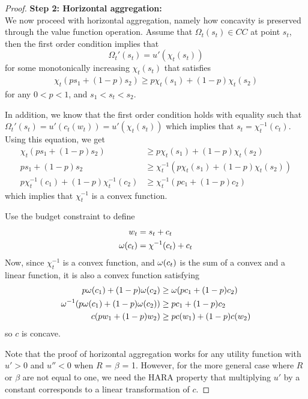 \begin{proof}
	\bigskip
	\noindent \textbf{Step 2: Horizontal aggregation:} \\
	We now proceed with horizontal aggregation, namely how concavity is preserved through the value function operation. Assume that $\Omega_t(s_t) \in CC$ at point $s_t$, then the first order condition implies that
	\[\Omega_t'(s_t) = u'(\chi_t(s_t))\]
	for some monotonically increasing $\chi_t(s_t)$ that satisfies
	\begin{align}
	\chi_t(ps_1 + (1-p)s_2) \geq p\chi_t(s_1) + (1-p)\chi_t(s_2) \label{eq:hor_conc}
	\end{align}
	for any $0 < p < 1$, and $s_1 < s_t < s_2$. %
	
	In addition, we know that the first order condition holds with equality such that $\Omega_t'(s_t) = u'(c_t(w_t)) = u'(\chi_t(s_t))$ which implies that $s_t = \chi_t^{-1}(c_t)$. Using this equation, we get
	\begin{align*}
	\chi_t(ps_1 + (1-p)s_2) &\geq p\chi_t(s_1) + (1-p)\chi_t(s_2) \\
	ps_1 + (1-p)s_2 &\geq \chi_t^{-1}(p\chi_t(s_1) + (1-p)\chi_t(s_2)) \\
	p\chi_t^{-1}(c_1) + (1-p)\chi_t^{-1}(c_2) &\geq \chi_t^{-1}(pc_1 + (1-p)c_2)
	\end{align*}
	which implies that $\chi_t^{-1}$ is a convex function.
	
	Use the budget constraint to define
	\begin{align*}
	w_t &= s_t + c_t \\
	\omega(c_t) & = \chi^{-1}(c_t) + c_t
	\end{align*}
	Now, since $\chi_t^{-1}$ is a convex function, and $\omega(c_t)$ is the sum of a convex and a linear function, it is also a convex function satisfying
	\begin{align}
	p\omega(c_1) + (1-p)\omega(c_2) &\geq \omega(pc_1 + (1-p)c_2) \nonumber \\
	\omega^{-1}(p\omega(c_1) + (1-p)\omega(c_2)) &\geq pc_1 + (1-p)c_2 \nonumber \\
	c(pw_1 + (1-p)w_2) &\geq pc(w_1) + (1-p)c(w_2) \label{eq:hor_conc2}
	\end{align}
	so $c$ is concave.
	
	Note that the proof of horizontal aggregation works for any utility function with $u' > 0$ and $u'' < 0$ when $R$ = $\beta$ = 1. However, for the more general case where $R$ or $\beta$ are not equal to one, we need the HARA property that multiplying $u'$ by a constant corresponds to a linear transformation of $c$.
	

\end{proof}
